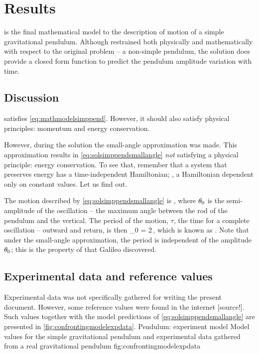 \section{Results}
 is the final mathematical model to the description of motion of a simple gravitational pendulum. Although restrained both physically and mathematically with respect to the original problem -- a non-simple pendulum, the solution does provide a closed form function to predict the pendulum amplitude variation with time. 


\subsection{Discussion}
 satisfies \cref{eq:mathmodelsimppend}. However, it should also satisfy physical principles: momentum and energy conservation.


However, during the solution the small-angle approximation was made. This approximation results in \cref{eq:solsimppendsmallangle} \emph{not} satisfying a physical principle: energy conservation. To see that, remember that a system that preserves energy has a time-independent Hamiltonian; \ie, a Hamiltonian dependent only on constant values. Let us find out.


\newcommand{\oscper}{\tau} %

The motion described by \cref{eq:solsimppendsmallangle} is , where $\theta_0$ is the semi-amplitude of the oscillation -- the maximum angle between the rod of the pendulum and the vertical. The period of the motion, $\oscper$, the time for a complete oscillation -- outward and return, is then
\beq
\oscper_0 = 2\pi\sqrt{\dfrac{\length}{\grav}}\,,
\eeq
which is known as . Note that under the small-angle approximation, the period is independent of the amplitude $\theta_0$; this is the property of  that Galileo discovered.


\subsection{Experimental data and reference values}
Experimental data was not specifically gathered for writing the present document. However, some reference values were found in the internet [source!]. Such values together with the model predictions of \cref{eq:solsimppendsmallangle} are presented in \cref{fig:confrontingmodelexpdata}.
%
   {Pendulum: experiment \vs model}
   {Model values for the simple gravitational pendulum and experimental data gathered from a real gravitational pendulum}%
   {fig:confrontingmodelexpdata}%

